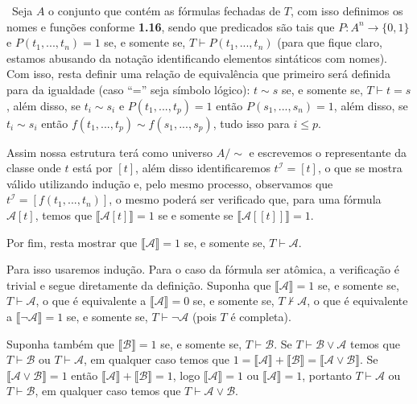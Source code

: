 \documentclass[11pt,a4paper]{article}
\def\dem{\par\smallbreak\noindent {\textit{ Demonstração:}} \ }
\theoremstyle{definition}
\begin{document}
\dem Seja $A$ o conjunto que contém as fórmulas fechadas de $T$, com isso definimos os nomes e funções conforme \textbf{1.16}, sendo que predicados são tais que $P: A^n\rightarrow \{0,1\}$ e $P(t_1,...,t_n)=1$ se, e somente se, $T\vdash P(t_1,...,t_n)$ (para que fique claro, estamos abusando da notação identificando elementos sintáticos com nomes). Com isso, resta definir uma relação de equivalência que primeiro será definida para da igualdade (caso ``='' seja símbolo lógico): $t \sim s$ se, e somente se, $T\vdash t=s$, além disso, se $t_i \sim s_i$ e $P(t_1,...,t_p)=1$ então $P(s_1,...,s_n)=1$, além disso, se $t_i\sim s_i$ então $f(t_1,...,t_p)\sim f(s_1,...,s_p)$, tudo isso para $i\leq p$. 

Assim nossa estrutura terá como universo $A/\sim$ e escrevemos o representante da classe onde $t$ está por $[t]$, além disso identificaremos $t^{\mathscr{I}}=[t]$, o que se mostra válido utilizando indução e, pelo mesmo processo, observamos que $t^{\mathscr{I}}=[f(t_1,...,t_n)]$, o mesmo poderá ser verificado que, para uma fórmula $\mathscr{A}[t]$, temos que $\llbracket \mathscr{A}[t] \rrbracket=1$ se e somente se  $\llbracket \mathscr{A}[[t]] \rrbracket=1$. 

Por fim, resta mostrar que  $\llbracket \mathscr{A}\rrbracket=1$ se, e somente se, $ T \vdash \mathscr{A}$. 

Para isso usaremos indução. Para o caso da fórmula ser atômica, a verificação é trivial e segue diretamente da definição. Suponha que  $\llbracket \mathscr{A}\rrbracket=1$ se, e somente se, $ T \vdash \mathscr{A}$, o que é equivalente a $\llbracket \mathscr{A}\rrbracket=0$ se, e somente se, $ T \nvdash \mathscr{A}$, o que é equivalente a $\llbracket \neg \mathscr{A}\rrbracket=1$ se, e somente se, $ T \vdash \neg \mathscr{A}$ (pois $T$ é completa). 

Suponha também que $\llbracket \mathscr{B}\rrbracket=1$ se, e somente se, $ T \vdash \mathscr{B}$. Se $T\vdash \mathscr{B} \vee \mathscr{A}$ temos que  $T\vdash \mathscr{B}$ ou  $T\vdash \mathscr{A}$, em qualquer caso temos que $1=\llbracket \mathscr{A}\rrbracket + \llbracket \mathscr{B}\rrbracket=\llbracket \mathscr{A}\vee \mathscr{B} \rrbracket$. Se $\llbracket \mathscr{A}\vee \mathscr{B} \rrbracket=1$ então $\llbracket \mathscr{A}\rrbracket + \llbracket \mathscr{B}\rrbracket=1$, logo $\llbracket \mathscr{A} \rrbracket=1$ ou $\llbracket \mathscr{A} \rrbracket=1$, portanto  $ T \vdash \mathscr{A}$ ou  $ T \vdash \mathscr{B}$, em qualquer caso temos que  $ T \vdash \mathscr{A}\vee \mathscr{B}$. 
\end{document}

